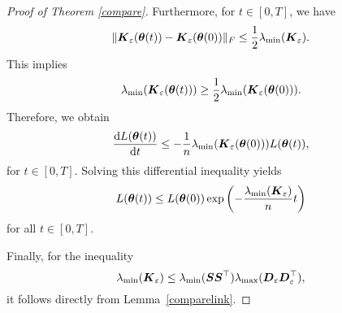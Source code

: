 \begin{proof}[Proof of Theorem \ref{compare}]
    Furthermore, for \( t \in [0,T] \), we have 
    \[
    \|\boldsymbol{K}_\varepsilon(\boldsymbol{\theta}(t)) - \boldsymbol{K}_\varepsilon(\boldsymbol{\theta}(0))\|_F \leq \frac{1}{2} \lambda_{\text{min}}(\boldsymbol{K}_\varepsilon).
    \]
    This implies
    \[
    \lambda_{\text{min}}(\boldsymbol{K}_\varepsilon(\boldsymbol{\theta}(t))) \geq \frac{1}{2} \lambda_{\text{min}}(\boldsymbol{K}_\varepsilon(\boldsymbol{\theta}(0))).
    \]
    Therefore, we obtain
    \begin{align}
    \frac{\mathrm{d} L(\boldsymbol{\theta}(t))}{\mathrm{d} t} \leq -\frac{1}{n} \lambda_{\text{min}}(\boldsymbol{K}_\varepsilon(\boldsymbol{\theta}(0))) L(\boldsymbol{\theta}(t)),
    \end{align}
    for \( t \in [0,T] \). Solving this differential inequality yields
    \begin{equation}
    L(\boldsymbol{\theta}(t)) \leq L(\boldsymbol{\theta}(0))\exp\left(-\frac{\lambda_{\text{min}}(\boldsymbol{K}_{\varepsilon})}{n} t\right)
    \end{equation}
    for all \( t \in [0, T] \).

    Finally, for the inequality
    \begin{equation}
    \lambda_{\text{min}}(\boldsymbol{K}_{\varepsilon}) \leq \lambda_{\text{min}}(\boldsymbol{S}\boldsymbol{S}^{\top}) \lambda_{\text{max}}(\boldsymbol{D}_{\varepsilon}\boldsymbol{D}_{\varepsilon}^\top),
    \end{equation}
    it follows directly from Lemma~\ref{comparelink}.
\end{proof}
